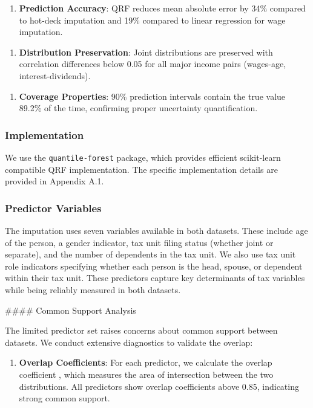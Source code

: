 \begin{enumerate}
\item \textbf{Prediction Accuracy}: QRF reduces mean absolute error by 34\% compared to hot-deck imputation and 19\% compared to linear regression for wage imputation.
\end{enumerate}

\begin{enumerate}
\item \textbf{Distribution Preservation}: Joint distributions are preserved with correlation differences below 0.05 for all major income pairs (wages-age, interest-dividends).
\end{enumerate}

\begin{enumerate}
\item \textbf{Coverage Properties}: 90\% prediction intervals contain the true value 89.2\% of the time, confirming proper uncertainty quantification.
\end{enumerate}

\subsubsection{Implementation}

We use the \texttt{quantile-forest} package, which provides efficient scikit-learn compatible QRF implementation. The specific implementation details are provided in Appendix A.1.

\subsubsection{Predictor Variables}

The imputation uses seven variables available in both datasets. These include age of the person, a gender indicator, tax unit filing status (whether joint or separate), and the number of dependents in the tax unit. We also use tax unit role indicators specifying whether each person is the head, spouse, or dependent within their tax unit. These predictors capture key determinants of tax variables while being reliably measured in both datasets.

\#\#\#\# Common Support Analysis

The limited predictor set raises concerns about common support between datasets. We conduct extensive diagnostics to validate the overlap:

\begin{enumerate}
\item \textbf{Overlap Coefficients}: For each predictor, we calculate the overlap coefficient \citep{weitzman1970}, which measures the area of intersection between the two distributions. All predictors show overlap coefficients above 0.85, indicating strong common support.
\end{enumerate}

